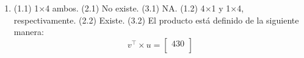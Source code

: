 \documentclass[10pt]{article}
\begin{document}
\begin{enumerate}
\begin{enumerate}
	\item (1.1) 1$\times$4 ambos. (2.1) No existe. (3.1) NA. (1.2) 4$\times$1 y 1$\times$4, respectivamente. (2.2) Existe. (3.2) El producto est\'a definido de la siguiente manera: \[ v^{\top}  \times u = 
					\begin{bmatrix}
					430 \\
					\end{bmatrix} 
			\] 




\end{enumerate}





\end{enumerate}
\end{document}
